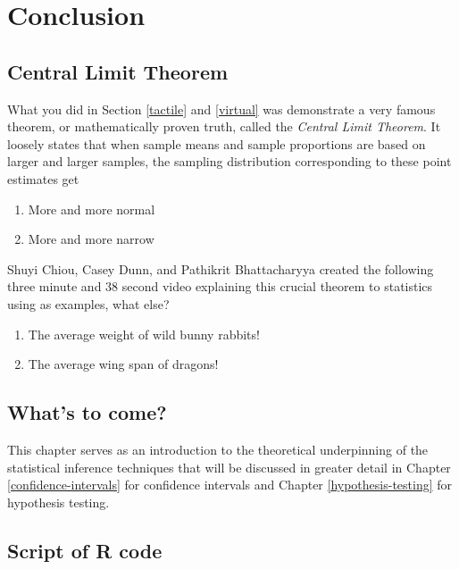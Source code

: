\documentclass[12pt,]{krantz}
\providecommand{\tightlist}{%
  \setlength{\itemsep}{0pt}\setlength{\parskip}{0pt}}
\theoremstyle{definition}
\theoremstyle{definition}
\theoremstyle{definition}
\theoremstyle{remark}
\begin{document}
\section{Conclusion}\label{conclusion-6}

\subsection{Central Limit Theorem}\label{central-limit-theorem}

What you did in Section \ref{tactile} and \ref{virtual} was demonstrate
a very famous theorem, or mathematically proven truth, called the
\emph{Central Limit Theorem}. It loosely states that when sample means
and sample proportions are based on larger and larger samples, the
sampling distribution corresponding to these point estimates get

\begin{enumerate}
\def\labelenumi{\arabic{enumi}.}
\tightlist
\item
  More and more normal
\item
  More and more narrow
\end{enumerate}

Shuyi Chiou, Casey Dunn, and Pathikrit Bhattacharyya created the
following three minute and 38 second video explaining this crucial
theorem to statistics using as examples, what else?

\begin{enumerate}
\def\labelenumi{\arabic{enumi}.}
\tightlist
\item
  The average weight of wild bunny rabbits!
\item
  The average wing span of dragons!
\end{enumerate}

\subsection{What's to come?}\label{whats-to-come-5}

This chapter serves as an introduction to the theoretical underpinning
of the statistical inference techniques that will be discussed in
greater detail in Chapter \ref{confidence-intervals} for confidence
intervals and Chapter \ref{hypothesis-testing} for hypothesis testing.

\subsection{Script of R code}\label{script-of-r-code-5}
\end{document}
